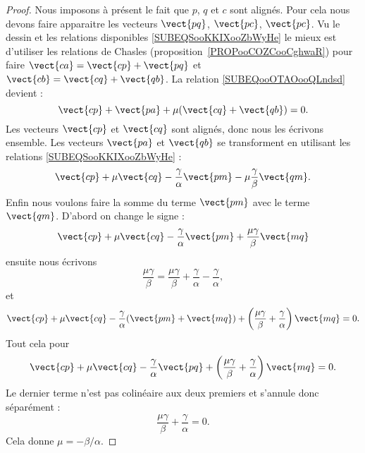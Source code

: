 \begin{proof}
    Nous imposons à présent le fait que \( p\), \( q\) et \( c \) sont alignés. Pour cela nous devons faire apparaitre les vecteurs \( \vect{ pq }\), \( \vect{ pc }\), \( \vect{ pc }\). Vu le dessin et les relations disponibles \eqref{SUBEQSooKKIXooZbWyHe} le mieux est d'utiliser les relations de Chasles  (proposition~\ref{PROPooCOZCooCghwaR}) pour faire \( \vect{ ca }=\vect{ cp }+\vect{ pq }\) et \( \vect{ cb }=\vect{ cq }+\vect{ qb }\).  La relation \eqref{SUBEQooOTAOooQLndsd} devient :
    \begin{equation}
        \vect{ cp }+\vect{ pa }+\mu(\vect{ cq }+\vect{ qb })=0.
    \end{equation}
    Les vecteurs \( \vect{ cp }\) et \( \vect{ cq }\) sont alignés, donc nous les écrivons ensemble. Les vecteurs \( \vect{ pa }\) et \( \vect{ qb }\) se transforment en utilisant les relations \eqref{SUBEQSooKKIXooZbWyHe} :
    \begin{equation}
        \vect{ cp }+\mu\vect{ cq }-\frac{ \gamma }{ \alpha }\vect{ pm }-\mu\frac{ \gamma }{ \beta }\vect{ qm }.
    \end{equation}
    Enfin nous voulons faire la somme du terme \( \vect{ pm }\) avec le terme \( \vect{ qm }\). D'abord on change le signe :
    \begin{equation}
        \vect{ cp }+\mu\vect{ cq }-\frac{ \gamma }{ \alpha }\vect{ pm }+\frac{ \mu\gamma }{ \beta }\vect{ mq }
    \end{equation}
    ensuite nous écrivons
    \begin{equation}
        \frac{ \mu\gamma }{ \beta }=\frac{ \mu\gamma }{ \beta }+\frac{ \gamma }{ \alpha }-\frac{ \gamma }{ \alpha },
    \end{equation}
    et
    \begin{equation}
        \vect{ cp }+\mu\vect{ cq }-\frac{ \gamma }{ \alpha }(\vect{ pm }+\vect{ mq })+\left( \frac{ \mu\gamma }{ \beta }+\frac{ \gamma }{ \alpha } \right)\vect{ mq }=0.
    \end{equation}
    Tout cela pour
    \begin{equation}
        \vect{ cp }+\mu\vect{ cq }-\frac{ \gamma }{ \alpha }\vect{ pq }+\left( \frac{ \mu\gamma }{ \beta }+\frac{ \gamma }{ \alpha } \right)\vect{ mq }=0.
    \end{equation}
    Le dernier terme n'est pas colinéaire aux deux premiers et s'annule donc séparément :
    \begin{equation}
        \frac{ \mu\gamma }{ \beta }+\frac{ \gamma }{ \alpha }=0.
    \end{equation}
    Cela donne \( \mu=-\beta/\alpha\).


\end{proof}
